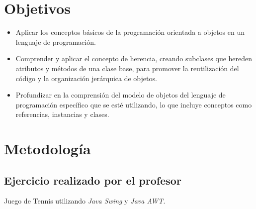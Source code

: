 \documentclass[11pt, twocolumn]{article}
\begin{document}
  \section*{Objetivos}
  \begin{itemize}
    \item Aplicar los conceptos básicos de la programación orientada a objetos en un lenguaje de programación.
    \item Comprender y aplicar el concepto de herencia, creando subclases que hereden atributos y métodos de una clase base, para promover la reutilización del código y la organización jerárquica de objetos.
    \item Profundizar en la comprensión del modelo de objetos del lenguaje de programación específico que se esté utilizando, lo que incluye conceptos como referencias, instancias y clases.
  \end{itemize}

  \section*{Metodología} 
  \subsection*{Ejercicio realizado por el profesor}
  Juego de Tennis utilizando \textit{Java Swing} y \textit{Java AWT}.  
\end{document}
